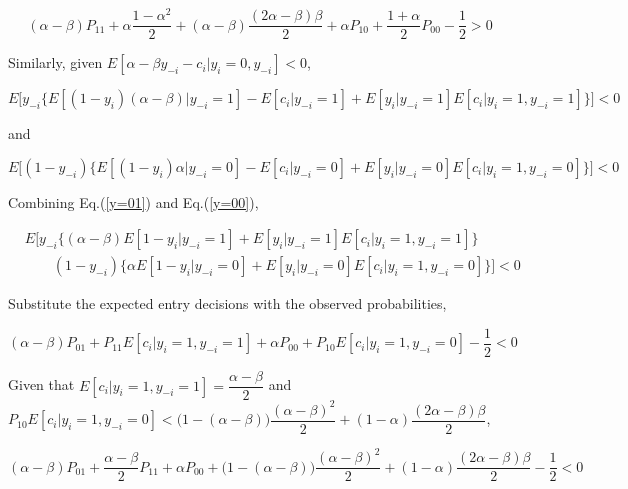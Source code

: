 \documentclass[a4paper]{article}
\begin{document}
\begin{equation}
    (\alpha - \beta)P_{11} + \alpha\dfrac{1 - \alpha^2}{2} + (\alpha- \beta)\dfrac{(2\alpha - \beta)\beta}{2} + \alpha P_{10} + \dfrac{1 + \alpha}{2}P_{00} - \dfrac{1}{2} > 0
    \label{y1=1}
\end{equation}

Similarly, given $E[\alpha - \beta y_{-i} - c_i|y_i = 0, y_{-i}] < 0$, 

\begin{equation}
    E\Bigg[y_{-i}\Big\{E[(1 - y_i)(\alpha - \beta) | y_{-i} = 1] - E[c_i | y_{-i} = 1] + E[y_i|y_{-i} = 1]E[c_i|y_i = 1, y_{-i} = 1]\Big\}\Bigg] < 0
    \label{y=01}
\end{equation}

and 

\begin{equation}
    E\Bigg[(1 - y_{-i})\Big\{
    E[(1 - y_i)\alpha| y_{-i} = 0] - E[c_i | y_{-i} = 0] + E[y_i|y_{-i} = 0]E[c_i|y_i = 1, y_{-i} = 0] \Big\}\Bigg] < 0 
    \label{y=00}
\end{equation}

Combining Eq.(\ref{y=01}) and Eq.(\ref{y=00}),


\begin{equation}
    \begin{array}{rl}
    &E\Bigg[y_{-i}\Big\{(\alpha - \beta) E[1 - y_i| y_{-i} = 1] + E[y_i|y_{-i} = 1]E[c_i|y_i = 1, y_{-i} = 1]\Big\}\\
    & \qquad (1 - y_{-i})\Big\{
    \alpha E[1 - y_i| y_{-i} = 0]  + E[y_i|y_{-i} = 0]E[c_i|y_i = 1, y_{-i} = 0] \Big\} \Bigg] < 0 
    \end{array}
\end{equation}

Substitute the expected entry decisions with the observed probabilities, 

\begin{equation}
    (\alpha - \beta)P_{01} + P_{11}E[c_i|y_i = 1, y_{-i} = 1] + \alpha P_{00} + P_{10}E[c_i|y_i = 1, y_{-i} = 0] - \dfrac{1}{2} < 0
    \label{y1=0}
\end{equation}

Given that $E[c_i|y_i = 1, y_{-i} = 1] = \dfrac{\alpha - \beta}{2}$ and $P_{10}E[c_i|y_i = 1, y_{-i} = 0] < \big(1 - (\alpha - \beta)\big)\dfrac{(\alpha - \beta)^2}{2} + (1 - \alpha)\dfrac{(2\alpha - \beta)\beta}{2}$, 

\begin{equation}
    (\alpha - \beta)P_{01} + \dfrac{\alpha - \beta}{2}P_{11} + \alpha P_{00} + \big(1 - (\alpha - \beta)\big)\dfrac{(\alpha - \beta)^2}{2} + (1 - \alpha)\dfrac{(2\alpha - \beta)\beta}{2} - \dfrac{1}{2} < 0
\end{equation}
\end{document}
